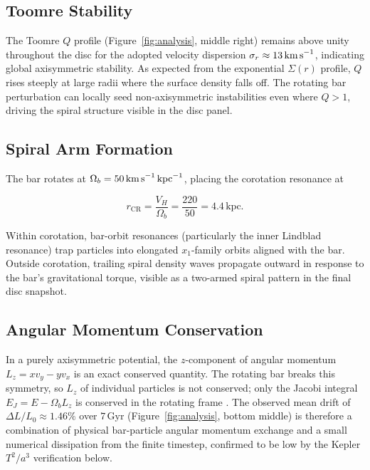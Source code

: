 \documentclass[12pt, letterpaper]{article}
\begin{document}
\subsection{Toomre Stability}

The Toomre $Q$ profile (Figure~\ref{fig:analysis}, middle right) remains above unity throughout the disc for the adopted velocity dispersion $\sigma_r \approx 13\,\text{km\,s}^{-1}$, indicating global axisymmetric stability. As expected from the exponential $\Sigma(r)$ profile, $Q$ rises steeply at large radii where the surface density falls off. The rotating bar perturbation can locally seed non-axisymmetric instabilities even where $Q > 1$, driving the spiral structure visible in the disc panel.

\subsection{Spiral Arm Formation}

The bar rotates at $\Omega_b = 50\,\text{km\,s}^{-1}\,\text{kpc}^{-1}$, placing the corotation resonance at

\begin{equation}
    r_\text{CR} = \frac{V_H}{\Omega_b} = \frac{220}{50} = 4.4\,\text{kpc}.
\end{equation}

Within corotation, bar-orbit resonances (particularly the inner Lindblad resonance) trap particles into elongated $x_1$-family orbits aligned with the bar. Outside corotation, trailing spiral density waves propagate outward in response to the bar's gravitational torque, visible as a two-armed spiral pattern in the final disc snapshot.

\subsection{Angular Momentum Conservation}

In a purely axisymmetric potential, the $z$-component of angular momentum $L_z = x v_y - y v_x$ is an exact conserved quantity. The rotating bar breaks this symmetry, so $L_z$ of individual particles is not conserved; only the Jacobi integral $E_J = E - \Omega_b L_z$ is conserved in the rotating frame \citep{BinneyTremaine2008}. The observed mean drift of $\Delta L/L_0 \approx 1.46\%$ over $7\,\text{Gyr}$ (Figure~\ref{fig:analysis}, bottom middle) is therefore a combination of physical bar-particle angular momentum exchange and a small numerical dissipation from the finite timestep, confirmed to be low by the Kepler $T^2/a^3$ verification below.
\end{document}
